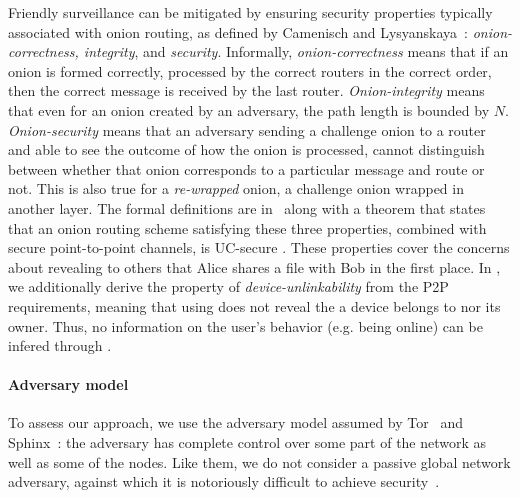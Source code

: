 Friendly surveillance can be mitigated by ensuring security properties 
typically associated with onion routing, as defined by Camenisch and Lysyanskaya~\cite{CLOnionRouting}: 
\textit{onion-correctness, integrity}, and \textit{security}. %
Informally, \textit{onion-correctness} means that if an onion is formed
correctly, processed by the correct routers in the correct order, then
the correct message is received by the last router. \textit{Onion-integrity}
means that even for an onion created by an adversary, the path length
is bounded by $N$. \textit{Onion-security} means that an adversary sending a
challenge onion  to a router and able to see the outcome of how the
onion is processed, cannot distinguish between whether that onion
corresponds to a particular message and route or not. This is also
true for a \emph{re-wrapped} onion, \ie a challenge onion wrapped in
another layer. The formal definitions are in~\cite{CLOnionRouting} along
with a theorem that states that an onion routing scheme satisfying
these three properties, combined with secure point-to-point channels,
is UC-secure .
These properties cover the concerns about
revealing to others that Alice shares a file with Bob in the first
place. In \name, we additionally derive the property of
\emph{device-unlinkability} from the \ac{P2P} requirements, meaning that
using \name does not reveal the \squad a device belongs to nor its
owner. Thus, no information on the user's behavior (e.g. being online)
can be infered through \name. 



\paragraph*{Adversary model} To assess our approach, we use the
adversary model assumed by Tor~\cite{Tor} and Sphinx~\cite{Sphinx}:
the adversary has complete control over some part of the network as
well as some of the nodes. Like them, we do not consider a passive global network
adversary, against which it is notoriously difficult to achieve
security~\cite{SystemsForAnonymousCommunication}.
